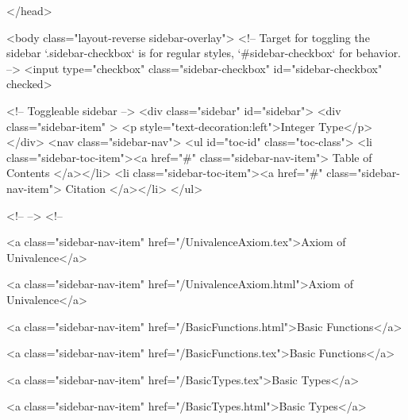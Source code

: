   
</head>




  <body class="layout-reverse sidebar-overlay">
    <!-- Target for toggling the sidebar `.sidebar-checkbox` is for regular
     styles, `#sidebar-checkbox` for behavior. -->
<input type="checkbox" class="sidebar-checkbox" id="sidebar-checkbox" checked>

<!-- Toggleable sidebar -->
<div class="sidebar" id="sidebar">
  <div class="sidebar-item" >
    <p style="text-decoration:left">Integer Type</p>
  </div>
  <nav class="sidebar-nav">
    <ul id="toc-id" class="toc-class">
  <li class="sidebar-toc-item"><a href="#" class="sidebar-nav-item"> Table of Contents </a></li>
  <li class="sidebar-toc-item"><a href="#" class="sidebar-nav-item"> Citation </a></li>
</ul>


    <!--  -->
    <!-- 
      
    
      
    
      
    
      
    
      
        
      
    
      
        
          <a class="sidebar-nav-item" href="/UnivalenceAxiom.tex">Axiom of Univalence</a>
        
      
    
      
        
          <a class="sidebar-nav-item" href="/UnivalenceAxiom.html">Axiom of Univalence</a>
        
      
    
      
        
          <a class="sidebar-nav-item" href="/BasicFunctions.html">Basic Functions</a>
        
      
    
      
        
          <a class="sidebar-nav-item" href="/BasicFunctions.tex">Basic Functions</a>
        
      
    
      
        
          <a class="sidebar-nav-item" href="/BasicTypes.tex">Basic Types</a>
        
      
    
      
        
          <a class="sidebar-nav-item" href="/BasicTypes.html">Basic Types</a>
        
      
    
